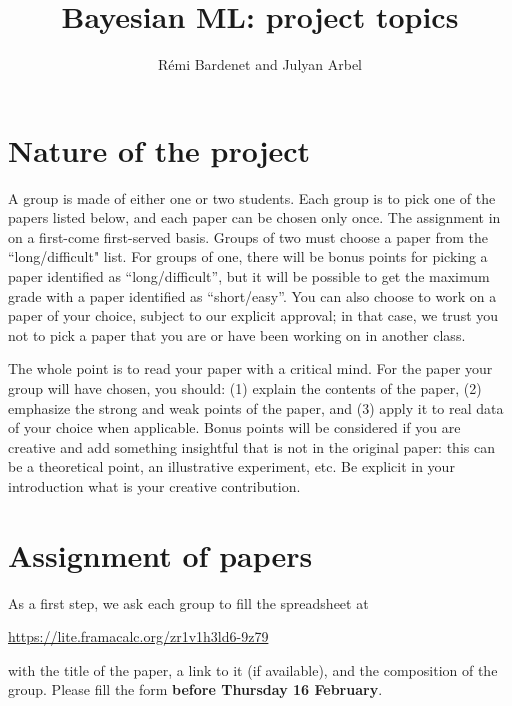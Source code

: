 \documentclass[12pt]{article}%
\begin{document}
\title{Bayesian ML: project topics}
\author{R\'emi Bardenet and Julyan Arbel}
\maketitle

\section{Nature of the project}
A group is made of either one or two students.
Each group is to pick one of the papers listed below, and each paper can be chosen only once.
The assignment in on a first-come first-served basis.
Groups of two must choose a paper from the ``long/difficult" list. 
For groups of one, there will be bonus points for picking a paper identified as ``long/difficult'', but it will be possible to get the maximum grade with a paper identified as ``short/easy''.
You can also choose to work on a paper of your choice, subject to our explicit approval; in that case, we trust you not to pick a paper that you are or have been working on in another class.

The whole point is to read your paper with a critical mind. 
For the paper your group will have chosen, you should: (1) explain the contents of the paper, (2) emphasize the strong and weak points of the paper, and (3) apply it to real data of your choice when applicable. 
Bonus points will be considered if you are creative and add something insightful that is not in the original paper: this can be a theoretical point, an illustrative experiment, etc. 
Be explicit in your introduction what is your creative contribution.

\section{Assignment of papers}
As a first step, we ask each group to fill the spreadsheet at
\begin{center}
   \href{https://lite.framacalc.org/zr1v1h3ld6-9z79}{https://lite.framacalc.org/zr1v1h3ld6-9z79}
 \end{center}
with the title of the paper, a link to it (if available), and the composition of the group.
Please fill the form {\bf before Thursday 16 February}. 
\end{document}
